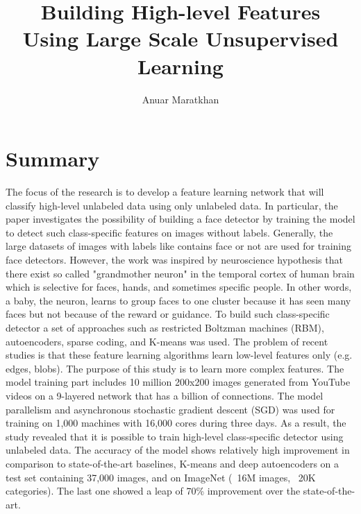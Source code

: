 \documentclass{IEEEtran}
\begin{document}
\title{Building High-level Features\\Using Large Scale Unsupervised Learning}

\author{Anuar Maratkhan}

\maketitle

\section{Summary}

The focus of the research is to develop a feature learning network that will classify high-level unlabeled data using only unlabeled data. In particular, the paper investigates the possibility of building a face detector by training the model to detect such class-specific features on images without labels. Generally, the large datasets of images with labels like contains face or not are used for training face detectors. However, the work was inspired by neuroscience hypothesis that there exist so called "grandmother neuron" in the temporal cortex of human brain which is selective for faces, hands, and sometimes specific people. In other words, a baby, the neuron, learns to group faces to one cluster because it has seen many faces but not because of the reward or guidance. To build such class-specific detector a set of approaches such as restricted Boltzman machines (RBM), autoencoders, sparse coding, and K-means was used. The problem of recent studies is that these feature learning algorithms learn low-level features only (e.g. edges, blobs). The purpose of this study is to learn more complex features. The model training part includes 10 million 200x200 images generated from YouTube videos on a 9-layered network that has a billion of connections. The model parallelism and asynchronous stochastic gradient descent (SGD) was used for training on 1,000 machines with 16,000 cores during three days. As a result, the study revealed that it is possible to train high-level class-specific detector using unlabeled data. The accuracy of the model shows relatively high improvement in comparison to state-of-the-art baselines, K-means and deep autoencoders on a test set containing 37,000 images, and on ImageNet (~16M images, ~20K categories). The last one showed a leap of 70\% improvement over the state-of-the-art.



\end{document}
